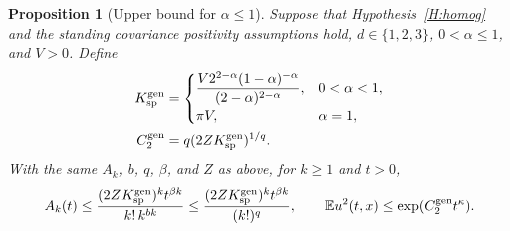 \documentclass[12pt]{article}
\numberwithin{equation}{section}
\newtheorem{proposition}[theorem]{Proposition}
\theoremstyle{definition}
\newcommand{\E}{\mathbb{E}}
\begin{document}
\begin{proposition}[Upper bound for $\alpha\le1$]\label{P:low-alpha-upper}
  Suppose that Hypothesis~\ref{H:homog} and the standing covariance
  positivity assumptions hold, $d\in\{1,2,3\}$, $0<\alpha\le1$,
  and $V>0$. Define
  \begin{equation}\label{E:low-alpha-constants}
    \begin{split}
      K_{\rm sp}^{\rm gen}
      &=\begin{cases}
        \displaystyle\frac{V2^{2-\alpha}(1-\alpha)^{-\alpha}}
        {(2-\alpha)^{2-\alpha}},&0<\alpha<1,\\[2mm]
        \pi V,&\alpha=1,
      \end{cases}\\
      C_2^{\rm gen}&=q(2ZK_{\rm sp}^{\rm gen})^{1/q}.
    \end{split}
  \end{equation}
  With the same $A_k$, $b$, $q$, $\beta$, and $Z$ as above, for
  $k\ge1$ and $t>0$,
  \begin{equation}\label{E:low-alpha-coefficient}
    A_k(t)\le\frac{(2ZK_{\rm sp}^{\rm gen})^k t^{\beta k}}
    {k!\,k^{bk}}
    \le\frac{(2ZK_{\rm sp}^{\rm gen})^k t^{\beta k}}{(k!)^q},
    \qquad
    \E u^2(t,x)\le\exp(C_2^{\rm gen}t^\kappa).
  \end{equation}
\end{proposition}
\end{document}
